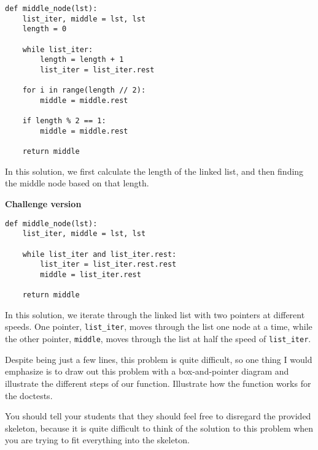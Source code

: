 \begin{solution}[0.6in]
\begin{lstlisting}
def middle_node(lst):
    list_iter, middle = lst, lst
    length = 0

    while list_iter:
        length = length + 1
        list_iter = list_iter.rest
    
    for i in range(length // 2):
        middle = middle.rest
    
    if length % 2 == 1:
        middle = middle.rest

    return middle   
\end{lstlisting} 

In this solution, we first calculate the length of the linked list, and then finding the middle node based on that length.

\textbf{Challenge version}
\begin{lstlisting}
def middle_node(lst):
    list_iter, middle = lst, lst

    while list_iter and list_iter.rest:
        list_iter = list_iter.rest.rest
        middle = list_iter.rest

    return middle
\end{lstlisting}

In this solution, we iterate through the linked list with two pointers at different speeds. One pointer, \lstinline{list_iter}, moves through the list one node at a time, while the other pointer, \lstinline{middle}, moves through the list at half the speed of \lstinline{list_iter}. 
\end{solution}

\begin{questionmeta}
Despite being just a few lines, this problem is quite difficult, so one thing I would emphasize is to draw out this problem with a box-and-pointer diagram and illustrate the different steps of our function. Illustrate how the function works for the doctests.
    
You should tell your students that they should feel free to disregard the provided skeleton, because it is quite difficult to think of the solution to this problem when you are trying to fit everything into the skeleton. 
\end{questionmeta}
    